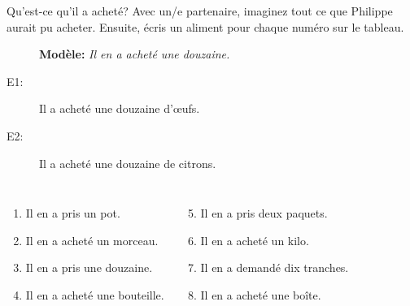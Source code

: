 \documentclass{beamer}
\begin{document}
  \begin{frame}{Qu'est-ce qu'il a acheté?}
    Avec un/e partenaire, imaginez tout ce que Philippe aurait pu acheter.
    Ensuite, écris un aliment pour chaque numéro sur le tableau. \\
    \begin{description}
      \item[] \textbf{Modèle:} \emph{Il en a acheté une douzaine.}
      \item[E1:] Il a acheté une douzaine d'œufs.
      \item[E2:] Il a acheté une douzaine de citrons.
    \end{description}
    \begin{columns}
        \begin{enumerate}
          \item Il en a pris un pot.
          \item Il en a acheté un morceau.
          \item Il en a pris une douzaine.
          \item Il en a acheté une bouteille.
        \end{enumerate}
        \begin{enumerate}
          \setcounter{enumi}{4}
          \item Il en a pris deux paquets.
          \item Il en a acheté un kilo.
          \item Il en a demandé dix tranches.
          \item Il en a acheté une boîte.
        \end{enumerate}
    \end{columns}
  \end{frame}
\end{document}
